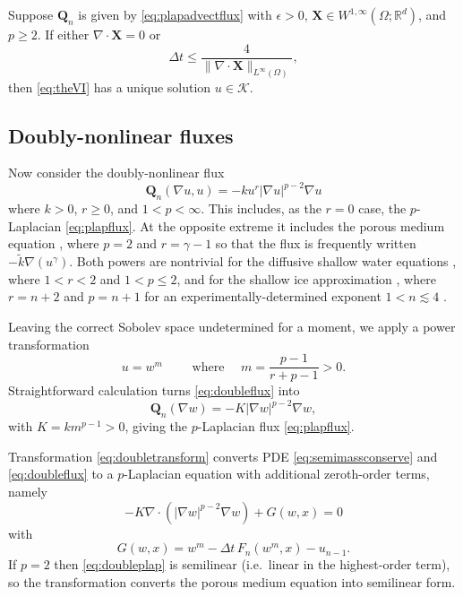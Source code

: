 \documentclass[final,leqno,onefignum,onetabnum]{siamltex1213bueler}
\newcommand\bQ{\mathbf{Q}}
\newcommand\bX{\mathbf{X}}
\newcommand{\Div}{\nabla\cdot}
\newcommand\eps{\epsilon}
\renewcommand{\grad}{\nabla}
\newcommand\RR{\mathbb{R}}
\begin{document}
\medskip
\begin{theorem}  \label{thm:plapadvectwellposed}  Suppose $\bQ_n$ is given by \eqref{eq:plapadvectflux} with $\eps>0$, $\bX \in W^{1,\infty}(\Omega;\RR^d)$, and $p\ge 2$.  If either $\Div \bX=0$ or
\begin{equation}
  \Delta t \le \frac{4}{\|\Div \bX\|_{L^\infty(\Omega)}}, \label{eq:plapadvectdtcond}
\end{equation}
then \eqref{eq:theVI} has a unique solution $u\in\mathcal{K}$.
\end{theorem}

\subsection{Doubly-nonlinear fluxes} \label{subsec:powertransform}  Now consider the doubly-nonlinear \cite{Raviart1970} flux
\begin{equation}
  \bQ_n(\grad u,u) = - k u^r |\grad u|^{p-2} \grad u \label{eq:doubleflux}
\end{equation}
where $k>0$, $r\ge 0$, and $1<p<\infty$.  This includes, as the $r=0$ case, the $p$-Laplacian \eqref{eq:plapflux}.  At the opposite extreme it includes the porous medium equation \cite{Vazquez2007}, where $p=2$ and $r=\gamma-1$ so that the flux is frequently written $- \tilde k \grad(u^\gamma)$.  Both powers are nontrivial for the diffusive shallow water equations \cite{AlonsoSantillanaDawson2008}, where $1<r<2$ and $1<p\le 2$, and for the shallow ice approximation \cite{Bueleretal2005,Calvoetal2002,JouvetBueler2012}, where $r=n+2$ and $p=n+1$ for an experimentally-determined exponent $1 < n \lesssim 4$ \cite{GoldsbyKohlstedt2001}.

Leaving the correct Sobolev space undetermined for a moment, we apply a power transformation
\begin{equation}
	u = w^m \qquad \text{ where } \quad m = \frac{p-1}{r+p-1} > 0. \label{eq:doubletransform}
\end{equation}
Straightforward calculation turns \eqref{eq:doubleflux} into
\begin{equation}
	\bQ_n(\grad w) = - K |\grad w|^{p-2} \grad w, \label{eq:doublenewflux}
\end{equation}
with $K=k m^{p-1}>0$, giving the $p$-Laplacian flux \eqref{eq:plapflux}.

Transformation  \eqref{eq:doubletransform} converts PDE \eqref{eq:semimassconserve} and \eqref{eq:doubleflux} to a $p$-Laplacian equation with additional zeroth-order terms, namely
\begin{equation}
    - K \Div\left(|\grad w|^{p-2} \grad w\right) + G(w,x) = 0  \label{eq:doubleplap}
\end{equation}
with
\begin{equation}
   G(w,x) = w^m - \Delta t\, F_n(w^m,x) - u_{n-1}. \label{eq:doubleGdefn}
\end{equation}
If $p=2$ then \eqref{eq:doubleplap} is semilinear (i.e.~linear in the highest-order term), so the transformation converts the porous medium equation into semilinear form.
\end{document}
